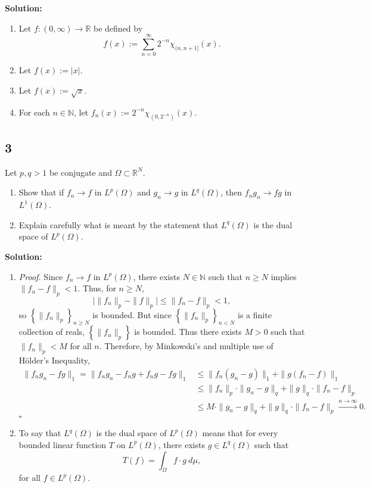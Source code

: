 \documentclass[12pt]{article}
\newcounter{ProofCounter}
\newenvironment{Proof}{\stepcounter{ProofCounter}\textit{Proof.}}{\hfill$\square$}
\begin{document}
{\bf Solution:}
\begin{enumerate}[label=(\alph*)]
\item Let $f : (0,\infty) \rightarrow \mathbb{R}$ be defined by 
\[ f(x) := \sum_{n=0}^{\infty}2^{-n}\chi_{(n,n+1]}(x). \]
\item Let $f(x) := |x|$.
\item Let $f(x) := \sqrt{x}$.
\item For each $n \in \mathbb{N}$, let $f_{n}(x) := 2^{-n}\chi_{(0,2^{-n})}(x)$.
\end{enumerate}


\subsection*{3}
Let $p, q > 1$ be conjugate and $\Omega \subset \mathbb{R}^{N}$.
\begin{enumerate}[label=(\alph*)]
\item Show that if $f_{n} \rightarrow f$ in $L^{p}(\Omega)$ and $g_{n} \rightarrow g$ in $L^{q}(\Omega)$, then $f_{n}g_{n} \rightarrow fg$ in
$L^{1}(\Omega)$.
\item Explain carefully what is meant by the statement that $L^{q}(\Omega)$ is the dual space of $L^{p}(\Omega)$.
\end{enumerate}

{\bf Solution:}
\begin{enumerate}[label=(\alph*)]
\item 
\begin{Proof}
Since $f_{n} \rightarrow f$ in $L^{p}(\Omega)$, there exists $N \in \mathbb{N}$ such that $n \geq N$ implies $\|f_{n} - f\|_{p} < 1$. Thus, for $n
\geq N$,
\[ \bigg| \|f_{n}\|_{p} - \|f\|_{p}\bigg| \leq \|f_{n} - f\|_{p} < 1, \]
so $\left\{ \|f_{n}\|_{p} \right\}_{n\geq N}$ is bounded.
But since $\left\{ \|f_{n}\|_{p} \right\}_{n<N}$ is a finite collection of reals, $\left\{ \|f_{n}\|_{p} \right\}$ is bounded. 
Thus there exists $M > 0$ such that $\|f_{n}\|_{p} < M$ for all $n$. Therefore, by Minkowski's and multiple use of H\"{o}lder's Inequality,
\begin{align*}
\|f_{n}g_{n} - fg\|_{1} = \|f_{n}g_{n} - f_{n}g + f_{n}g - fg\|_{1} & \leq \|f_{n}(g_{n} - g)\|_{1} + \|g(f_{n} - f)\|_{1} \\
& \leq \|f_{n}\|_{p}\cdot\|g_{n} - g\|_{q} + \|g\|_{q}\cdot\|f_{n} - f\|_{p} \\
& \leq M\cdot\|g_{n} - g\|_{q} + \|g\|_{q}\cdot\|f_{n} - f\|_{p} \stackrel{n\rightarrow\infty}{\longrightarrow} 0.
\end{align*}
\end{Proof}

\item To say that $L^{q}(\Omega)$ is the dual space of $L^{p}(\Omega)$ means that for every bounded linear function $T$ on $L^{p}(\Omega)$, there exists 
$g \in L^{q}(\Omega)$ such that
\[ T(f) = \int_{\Omega} f\cdot g\ d\mu, \]
for all $f \in L^{p}(\Omega)$.
\end{enumerate}
\end{document}
